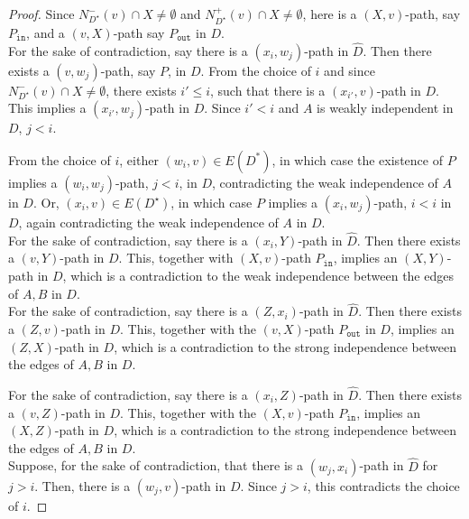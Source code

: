 \documentclass[a4paper,11pt]{article}
\newcommand{\out}{\texttt{out}}
\newcommand{\inp}{\texttt{in}}
\theoremstyle{plain}
\newtheorem{identification rule}{Identification Rule}
\theoremstyle{definition}
\theoremstyle{remark}
\begin{document}
\begin{proof}
Since $N_{D^{\star}}^-(v) \cap X \neq \emptyset$ and $N_{D^{\star}}^+(v) \cap X \neq \emptyset$, 
here is a $(X,v)$-path, say $P_{\inp}$, and a $(v,X)$-path say $P_{\out}$ in $D$.\\

 For the sake of contradiction, say there is a $(x_i,w_j)$-path in $\widehat{D}$. Then there exists a $(v,w_j)$-path, say $P$, in $D$. 
From the choice of $i$ and since $N_{D^{\star}}^-(v) \cap X \neq \emptyset$, there exists $i' \leq i$, such that there is a $(x_{i'},v)$-path in $D$. This implies a $(x_{i'},w_j)$-path in $D$. Since $i' <i$ and $A$ is weakly independent in $D$, $j < i$. 

From the choice of $i$, either $(w_i,v) \in E(D^*)$, in which case the existence of $P$ implies a $(w_i,w_j)$-path, $j<i$, in $D$, contradicting the weak independence of $A$ in $D$. Or, $(x_i,v) \in E(D^{\star})$, in which case $P$ implies a $(x_i,w_j)$-path, $i <i$ in $D$, again contradicting the weak independence of $A$ in $D$.\\

 For the sake of contradiction, say there is a $(x_i,Y)$-path in $\widehat{D}$. 
Then there exists a $(v,Y)$-path in $D$. 
This, together with $(X,v)$-path $P_{\inp}$, implies an $(X,Y)$-path in $D$, which is a contradiction to the weak independence between the edges of $A, B$ in $D$.\\

 For the sake of contradiction, 
say there is a $(Z,x_i)$-path in $\widehat{D}$. 
Then there exists a $(Z,v)$-path in $D$. This, together with the $(v,X)$-path $P_{\out}$ in $D$, implies an $(Z,X)$-path in $D$, which is a contradiction to the strong independence between the edges of $A, B$ in $D$.

For the sake of contradiction, 
say there is a $(x_i,Z)$-path in $\widehat{D}$. 
Then there exists a $(v,Z)$-path in $D$. This, together with the $(X,v)$-path $P_{\inp}$, implies an $(X,Z)$-path in $D$, which is a contradiction to the strong independence between the edges of $A, B$ in $D$.\\

Suppose, for the sake of contradiction, that there is a $(w_j,x_i)$-path in $\widehat{D}$ for $j>i$. Then, there is a $(w_j,v)$-path in $D$. Since $j >i$, this contradicts the choice of $i$.


\end{proof}
\end{document}
